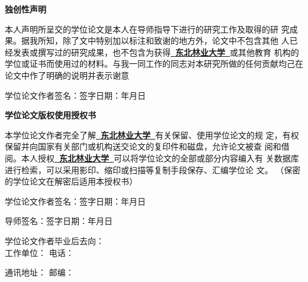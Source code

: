 \pagestyle{empty}
\newcommand{\subchapterstyle}%
  {\song\rmfamily\bfseries\xiaoer}  
\begin{center}{\subchapterstyle 独创性声明}\end{center}

 本人声明所呈交的学位论文是本人在导师指导下进行的研究工作及取得的研
 究成果。据我所知，除了文中特别加以标注和致谢的地方外，论文中不包含其他
 人已经发表或撰写过的研究成果，也不包含为获得\underline{\textbf{~东北林业大学~}}或其他教育
 机构的学位或证书而使用过的材料。与我一同工作的同志对本研究所做的任何贡献均己在论文中作了明确的说明并表示谢意

\vspace{\baselineskip}
\hspace{4em}学位论文作者签名：\hfill 签字日期：\hspace{2.5em}年\hspace{1.5em}月\hspace{1.5em}日

\vspace{2\baselineskip}
\begin{center}{\subchapterstyle 学位论文版权使用授权书}\end{center}

本学位论文作者完全了解\underline{\textbf{~东北林业大学~}}有关保留、使用学位论文的规
定，有权保留并向国家有关部门或机构送交论文的复印件和磁盘，允许论文被查
阅和借阅。本人授权\underline{\textbf{~东北林业大学~}}可以将学位论文的全部或部分内容编入有
关数据库进行检索，可以采用影印、缩印或扫描等复制手段保存、汇编学位论
文。
（保密的学位论文在解密后适用本授权书）

%
%

\vspace{\baselineskip}
\hspace{4em}学位论文作者签名：\hfill 签字日期：\hspace{2.5em}年\hspace{1.5em}月\hspace{1.5em}日

\vspace{\baselineskip}
\hspace{4em}导师签名：\hfill 签字日期：\hspace{2.5em}年\hspace{1.5em}月\hspace{1.5em}日

\vspace{2\baselineskip}
学位论文作者毕业后去向：\\

\vspace{\baselineskip}
\hspace{4em}工作单位：  \hfill 电话：

\vspace{\baselineskip}
\hspace{4em}通讯地址：  \hfill  邮编：

